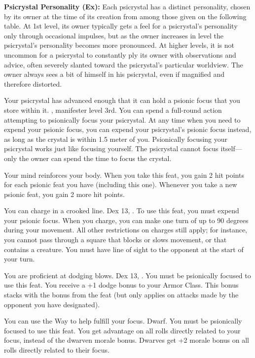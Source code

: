 {\textbf{Psicrystal Personality (Ex):} Each psicrystal has a distinct personality, chosen by its owner at the time of its creation from among those given on the following table. At 1st level, its owner typically gets a feel for a psicrystal's personality only through occasional impulses, but as the owner increases in level the psicrystal's personality becomes more pronounced. At higher levels, it is not uncommon for a psicrystal to constantly ply its owner with observations and advice, often severely slanted toward the psicrystal's particular worldview. The owner always sees a bit of himself in his psicrystal, even if magnified and therefore distorted.

}
{}{}

{Your psicrystal has advanced enough that it can hold a psionic focus that you store within it.}
{, manifester level 3rd.}
{You can spend a full-round action attempting to psionically focus your psicrystal. At any time when you need to expend your psionic focus, you can expend your psicrystal's psionic focus instead, as long as the crystal is within 1.5 meter of you. Psionically focusing your psicrystal works just like focusing yourself. The psicrystal cannot focus itself---only the owner can spend the time to focus the crystal.}
{}{}

{Your mind reinforces your body.}
{}
{When you take this feat, you gain 2 hit points for each psionic feat you have (including this one). Whenever you take a new psionic feat, you gain 2 more hit points.}
{}{}

{You can charge in a crooked line.}
{Dex 13, .}
{To use this feat, you must expend your psionic focus. When you charge, you can make one turn of up to 90 degrees during your movement. All other restrictions on charges still apply; for instance, you cannot pass through a square that blocks or slows movement, or that contains a creature. You must have line of sight to the opponent at the start of your turn.}
{}{}

{You are proficient at dodging blows.}
{Dex 13, .}
{You must be psionically focused to use this feat. You receive a +1 dodge bonus to your Armor Class. This bonus stacks with the bonus from the  feat (but only applies on attacks made by the opponent you have designated).}
{}{}

{You can use the Way to help fulfill your focus.}
{Dwarf.}
{You must be psionically focused to use this feat. You get advantage on all rolls directly related to your focus, instead of the dwarven morale bonus.}
{Dwarves get +2 morale bonus on all rolls directly related to their focus.}
{}

